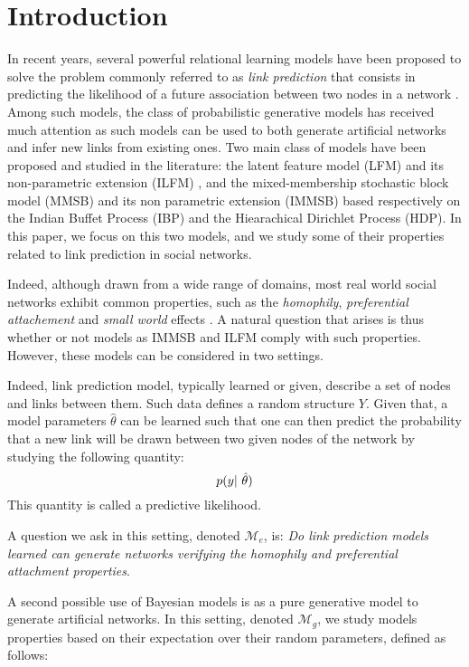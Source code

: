 \section{Introduction}
\label{sec:introduction}
In recent years, several powerful relational learning models have been proposed to solve the problem commonly referred to as \textit{link prediction} that consists in predicting the likelihood of a future association between two nodes in a network \cite{Liben-Nowell07, HassanZaki11}. Among such models, the class of probabilistic generative models has received much attention as such models can be used to both generate artificial networks and infer new links from existing ones. Two main class of models have been proposed and studied in the literature: the latent feature model (LFM) \cite{BMF} and its non-parametric extension (ILFM) \cite{ILFRM}, and the mixed-membership stochastic block model (MMSB) \cite{MMSB} and its non parametric extension (IMMSB) \cite{iMMSB,diMMSB} based respectively on the Indian Buffet Process (IBP) and the Hiearachical Dirichlet Process (HDP). In this paper, we focus on this two models, and we study some of their properties related to link prediction in social networks. 

Indeed, although drawn from a wide range of domains, most real world social networks exhibit common properties, such as the \textit{homophily}, \textit{preferential attachement} and \textit{small world} effects \cite{Newman2010, Barabasi2003}. A natural question that arises is thus whether or not models as IMMSB and ILFM comply with such properties. However, these models can be considered in two settings. 


Indeed, link prediction model, typically learned or given, describe a set of nodes and links between them. Such data defines a random structure $Y$. Given that, a model parameters $\hat \theta$ can be learned such that one can then predict the probability that a new link will be drawn between two given nodes of the network by studying the following quantity:
\begin{equation}
\p(y | \hat \theta)
\end{equation}
This quantity is called a predictive likelihood.


A question we ask in this setting, denoted $\mathcal{M}_e$, is: \textit{Do link prediction models learned can generate networks verifying the homophily and preferential attachment properties}.

A second possible use of Bayesian models is as a pure generative model to generate artificial networks. In this setting, denoted $\mathcal{M}_g$, we study models properties based on their expectation over their random parameters, defined as follows:

